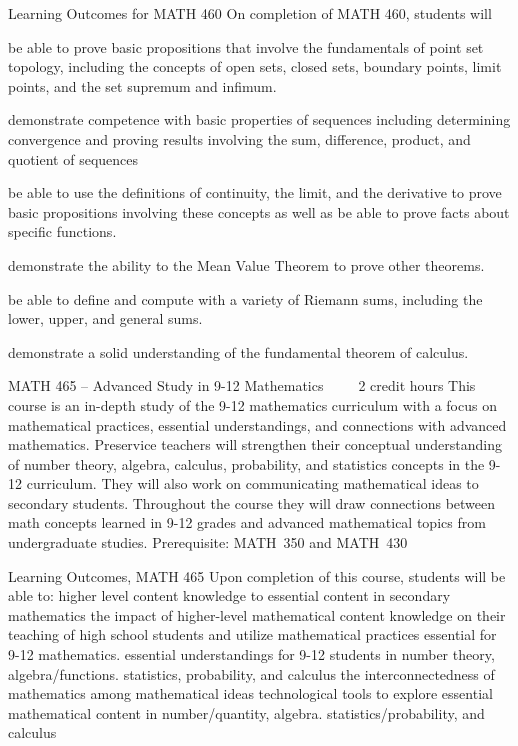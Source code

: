 Learning Outcomes for MATH 460
On completion of MATH 460, students will
    \item be able to prove basic propositions that involve the fundamentals of point set topology, including the concepts of open sets, closed sets, boundary points, limit points, and the set supremum and infimum. 
    \item demonstrate competence with basic properties of sequences including determining convergence and proving results involving the sum, difference, product, and quotient of sequences
    \item be able to use the definitions of continuity, the limit, and the derivative to prove basic propositions involving these concepts as well as be able to prove facts about specific functions.
    \item demonstrate the ability to the Mean Value Theorem to prove other theorems. 
    \item be able to define and compute with a variety of Riemann sums, including the lower, upper, and general sums.
    \item demonstrate a solid understanding of the fundamental theorem of calculus.

MATH 465 – Advanced Study in 9-12 Mathematics     2 credit hours
This course is an in-depth study of the 9-12 mathematics curriculum with a focus on mathematical practices, essential understandings, and connections with advanced mathematics. Preservice teachers will strengthen their conceptual understanding of number theory, algebra, calculus, probability, and statistics concepts in the 9-12 curriculum. They will also work on communicating mathematical ideas to secondary students. Throughout the course they will draw connections between math concepts learned in 9-12 grades and advanced mathematical topics from undergraduate studies.
Prerequisite: MATH 350 and MATH 430

Learning Outcomes, MATH 465
Upon completion of this course, students will be able to:
\itemConnect higher level content knowledge to essential content in secondary mathematics
\itemExplain the impact of higher-level mathematical content knowledge on their teaching of high school students
\itemArticulate and utilize mathematical practices essential for 9-12 mathematics.
\itemDescribe essential understandings for 9-12 students in number theory, algebra/functions. statistics, probability, and calculus
\itemDemonstrate the interconnectedness of mathematics among mathematical ideas
\itemUtilize technological tools to explore essential mathematical content in number/quantity, algebra. statistics/probability, and calculus

